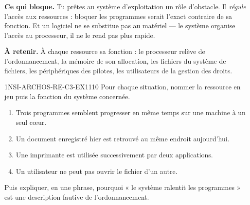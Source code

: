 

\textbf{Ce qui bloque.} Tu prêtes au système d'exploitation un rôle d'obstacle. Il
\emph{régule} l'accès aux ressources : bloquer les programmes serait l'exact contraire de sa
fonction. Et un logiciel ne se substitue pas au matériel — le système organise l'accès au
processeur, il ne le rend pas plus rapide.

\textbf{À retenir.} À chaque ressource sa fonction : le processeur relève de l'ordonnancement,
la mémoire de son allocation, les fichiers du système de fichiers, les périphériques des
pilotes, les utilisateurs de la gestion des droits.

\begin{exercice}{1NSI-ARCHOS-RE-C3-EX1}{1}{10}
Pour chaque situation, nommer la ressource en jeu puis la fonction du système concernée.
\begin{enumerate}
  \item Trois programmes semblent progresser en même temps sur une machine à un seul cœur.
  \item Un document enregistré hier est retrouvé au même endroit aujourd'hui.
  \item Une imprimante est utilisée successivement par deux applications.
  \item Un utilisateur ne peut pas ouvrir le fichier d'un autre.
\end{enumerate}
Puis expliquer, en une phrase, pourquoi « le système ralentit les programmes » est une
description fautive de l'ordonnancement.
\end{exercice}
